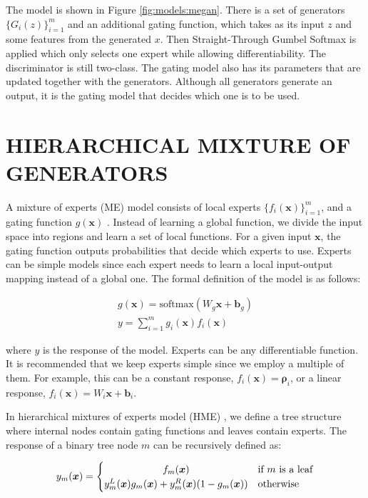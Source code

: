 \documentclass[a4paper,onesided,12pt]{report}
\begin{document}
The model is shown in Figure \ref{fig:models:megan}. There is a set of generators $\{G_i(z)\}_{i=1}^{m}$ and an additional gating function, which takes as its input $z$ and some features from the generated $x$. Then Straight-Through Gumbel Softmax is applied which only selects one expert while allowing differentiability. The discriminator is still two-class. The gating model also has its parameters that are updated together with the generators. Although all generators generate an output, it is the gating model that decides which one is to be used. 

%
%
%
\chapter{HIERARCHICAL MIXTURE OF GENERATORS}
\label{chapter:hme}

A mixture of experts (ME) model consists of local experts $\{f_i(\boldsymbol{x})\}_{i=1}^{m}$, and a gating function $g(\boldsymbol{x})$ \cite{me}. Instead of learning a global function, we divide the input space into regions and learn a set of local functions. For a given input $\boldsymbol{x}$, the gating function outputs probabilities that decide which experts to use. Experts can be simple models since each expert needs to learn a local input-output mapping instead of a global one. The formal definition of the model is as follows:

\begin{eqnarray}
g(\boldsymbol{x}) = \text{softmax}(W_g \boldsymbol{x} + \boldsymbol{b}_g)\\
y = \sum_{i=1}^m g_i(\boldsymbol{x}) f_i(\boldsymbol{x})
\end{eqnarray}

where $y$ is the response of the model. Experts can be any differentiable function. It is recommended that we keep experts simple since we employ a multiple of them. For example, this can be a constant response, $f_i(\boldsymbol{x})=\boldsymbol{\rho}_i$, or a linear response, $f_i(\boldsymbol{x})=W_i \boldsymbol{x} + \boldsymbol{b}_i$.

In hierarchical mixtures of experts model (HME) \cite{hme}, we define a tree structure where internal nodes contain gating functions and leaves contain experts. The response of a binary tree node $m$ can be recursively defined as:

\begin{equation}
y_m(\boldsymbol{x})=
	\begin{cases}
		\hfil f_m(\boldsymbol{x}) &\text{if $m$ is a leaf} \\
		\hfil y_m^{L}(\boldsymbol{x})g_m(\boldsymbol{x}) + y_m^{R}(\boldsymbol{x})(1 - g_m(\boldsymbol{x})) &\text{otherwise}
	\end{cases}
\end{equation}
\end{document}
